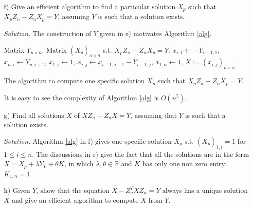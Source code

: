 \documentclass[12pt]{article}
\theoremstyle{plain}
\begin{document}
f) Give an efficient algorithm to find a particular solution $X_p$ such that $X_pZ_n - Z_nX_p = Y$, assuming $Y$ is such that a solution exists.

{\it Solution.} The construction of $Y$ given in e) motivates Algorithm \ref{alg}.

\begin{algorithm}
\centering
\begin{minipage}{0.95\textwidth}
\begin{algorithmic}
\Require Matrix $Y_{n\times n}$.
\Ensure Matrix $(X_p)_{n\times n}$ s.t. $X_pZ_n - Z_nX_p = Y$.
	\State $x_{i,1} \gets -Y_{i-1,1}$,
\EndFor
{}
	\State $x_{n,i} \gets Y_{n,i+1}$,
\EndFor
{}
	\State $x_{1,i} \gets 1$,
\EndFor
{}
		\State $x_{i,j} \gets x_{i-1,j-1} - Y_{i-1,j}$,
	\EndFor
\EndFor
\State $x_{1,n} \gets 1$,
 $X := (x_{i,j})_{n\times n}$.
\end{algorithmic}
\end{minipage}
\caption{The algorithm to compute one specific solution $X_p$ such that $X_pZ_n - Z_nX_p = Y$.}
\label{alg}
\end{algorithm}

It is easy to see the complexity of Algorithm \ref{alg} is $O(n^2)$.

g) Find all solutions $X$ of $XZ_n - Z_nX=Y$, assuming that $Y$ is such that a solution exists.

{\it Solution.} Algorithm \ref{alg} in f) gives one specific solution $X_p$ s.t. $(X_p)_{1,i}=1$ for $1\leq i\leq n$. The discussions in e) give the fact that all the solutions are in the form $X = X_p + \lambda Y_L + \theta K$, in which $\lambda,\theta\in\mathbb{R}$ and $K$ has only one non zero entry: $K_{1,n}=1$.

h) Given $Y$, show that the equation $X- Z_n^T XZ_n = Y$ always has a unique solution $X$ and give an efficient algorithm to compute $X$ from $Y$.
\end{document}
